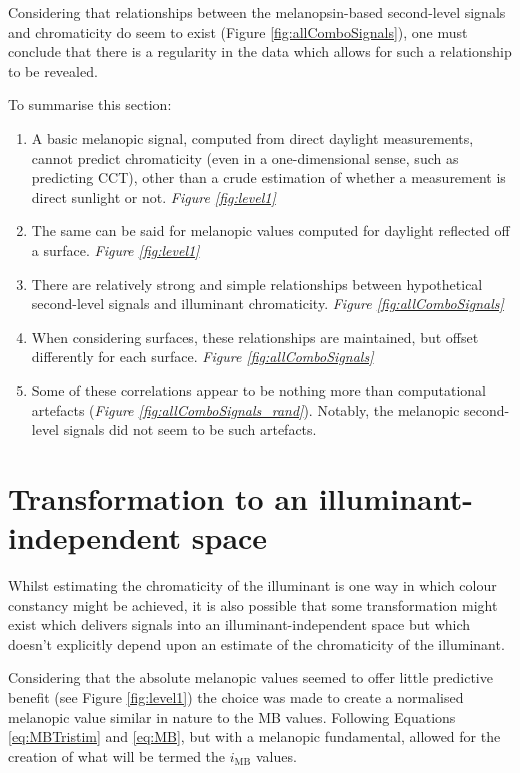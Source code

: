 Considering that relationships between the melanopsin-based second-level signals and chromaticity do seem to exist (Figure \ref{fig:allComboSignals}), one must conclude that there is a regularity in the data which allows for such a relationship to be revealed.

\bigskip
\noindent
To summarise this section:

\begin{enumerate}
   \item A basic melanopic signal, computed from direct daylight measurements, cannot predict chromaticity (even in a one-dimensional sense, such as predicting \gls{CCT}), other than a crude estimation of whether a measurement is direct sunlight or not. \emph{Figure \ref{fig:level1}}
    \item The same can be said for melanopic values computed for daylight reflected off a surface. \emph{Figure \ref{fig:level1}}
    \item There are relatively strong and simple relationships between hypothetical second-level signals and illuminant chromaticity. \emph{Figure \ref{fig:allComboSignals}}
    \item When considering surfaces, these relationships are maintained, but offset differently for each surface. \emph{Figure \ref{fig:allComboSignals}}
    \item Some of these correlations appear to be nothing more than computational artefacts (\emph{Figure \ref{fig:allComboSignals_rand}}). Notably, the melanopic second-level signals did not seem to be such artefacts.
\end{enumerate}

\section{Transformation to an illuminant-independent space}

Whilst estimating the chromaticity of the illuminant is one way in which colour constancy might be achieved, it is also possible that some transformation might exist which delivers signals into an illuminant-independent space but which doesn't explicitly depend upon an estimate of the chromaticity of the illuminant.

Considering that the absolute melanopic values seemed to offer little predictive benefit (see Figure \ref{fig:level1}) the choice was made to create a normalised melanopic value similar in nature to the MB values. Following Equations \ref{eq:MBTristim} and \ref{eq:MB}, but with a melanopic fundamental, allowed for the creation of what will be termed the $i_{\text{MB}}$ values.

